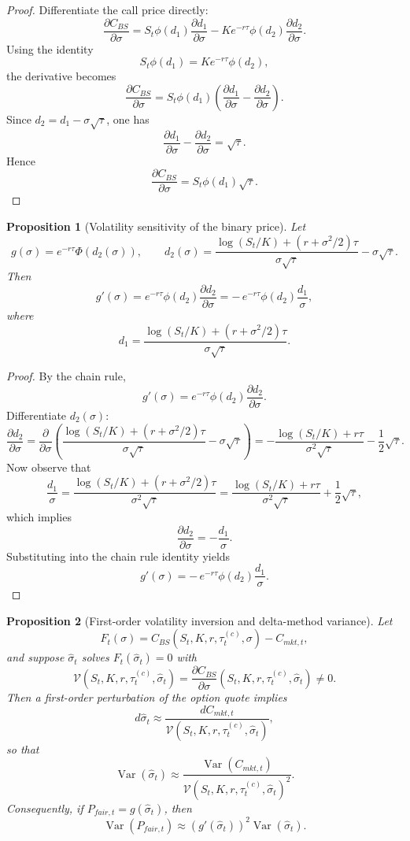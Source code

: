 \documentclass[11pt]{article}
\numberwithin{equation}{section}
\theoremstyle{plain}
\newtheorem{proposition}{Proposition}[section]
\begin{document}
\begin{proof}
Differentiate the call price directly:
\[
\frac{\partial C_{BS}}{\partial \sigma}
=
S_t\phi(d_1)\frac{\partial d_1}{\partial \sigma}
-Ke^{-r\tau}\phi(d_2)\frac{\partial d_2}{\partial \sigma}.
\]
Using the identity
\[
S_t\phi(d_1)=Ke^{-r\tau}\phi(d_2),
\]
the derivative becomes
\[
\frac{\partial C_{BS}}{\partial \sigma}
=
S_t\phi(d_1)\left(\frac{\partial d_1}{\partial \sigma}-\frac{\partial d_2}{\partial \sigma}\right).
\]
Since $d_2=d_1-\sigma\sqrt{\tau}$, one has
\[
\frac{\partial d_1}{\partial \sigma}-\frac{\partial d_2}{\partial \sigma}=\sqrt{\tau}.
\]
Hence
\[
\frac{\partial C_{BS}}{\partial \sigma}=S_t\phi(d_1)\sqrt{\tau}.
\]
\end{proof}

\begin{proposition}[Volatility sensitivity of the binary price]
\label{prop:digital-sensitivity}
Let
\[
g(\sigma)=e^{-r\tau}\Phi(d_2(\sigma)),
\qquad
d_2(\sigma)=\frac{\log(S_t/K)+(r+\sigma^2/2)\tau}{\sigma\sqrt{\tau}}-\sigma\sqrt{\tau}.
\]
Then
\[
g'(\sigma)
=
e^{-r\tau}\phi(d_2)\frac{\partial d_2}{\partial \sigma}
=
-\,e^{-r\tau}\phi(d_2)\frac{d_1}{\sigma},
\]
where
\[
d_1=\frac{\log(S_t/K)+(r+\sigma^2/2)\tau}{\sigma\sqrt{\tau}}.
\]
\end{proposition}

\begin{proof}
By the chain rule,
\[
g'(\sigma)=e^{-r\tau}\phi(d_2)\frac{\partial d_2}{\partial \sigma}.
\]
Differentiate $d_2(\sigma)$:
\[
\frac{\partial d_2}{\partial \sigma}
=
\frac{\partial}{\partial \sigma}
\left(
\frac{\log(S_t/K)+(r+\sigma^2/2)\tau}{\sigma\sqrt{\tau}}-\sigma\sqrt{\tau}
\right)
=
-\frac{\log(S_t/K)+r\tau}{\sigma^2\sqrt{\tau}}-\frac{1}{2}\sqrt{\tau}.
\]
Now observe that
\[
\frac{d_1}{\sigma}
=
\frac{\log(S_t/K)+(r+\sigma^2/2)\tau}{\sigma^2\sqrt{\tau}}
=
\frac{\log(S_t/K)+r\tau}{\sigma^2\sqrt{\tau}}+\frac{1}{2}\sqrt{\tau},
\]
which implies
\[
\frac{\partial d_2}{\partial \sigma}=-\frac{d_1}{\sigma}.
\]
Substituting into the chain rule identity yields
\[
g'(\sigma)=-\,e^{-r\tau}\phi(d_2)\frac{d_1}{\sigma}.
\]
\end{proof}

\begin{proposition}[First-order volatility inversion and delta-method variance]
\label{prop:iv-delta}
Let
\[
F_t(\sigma)=C_{BS}(S_t,K,r,\tau_t^{(c)},\sigma)-C_{mkt,t},
\]
and suppose $\hat{\sigma}_t$ solves $F_t(\hat{\sigma}_t)=0$ with
\[
\mathcal{V}(S_t,K,r,\tau_t^{(c)},\hat{\sigma}_t)
=
\frac{\partial C_{BS}}{\partial \sigma}(S_t,K,r,\tau_t^{(c)},\hat{\sigma}_t)\neq 0.
\]
Then a first-order perturbation of the option quote implies
\[
d\hat{\sigma}_t
\approx
\frac{dC_{mkt,t}}{\mathcal{V}(S_t,K,r,\tau_t^{(c)},\hat{\sigma}_t)},
\]
so that
\[
\operatorname{Var}(\hat{\sigma}_t)
\approx
\frac{\operatorname{Var}(C_{mkt,t})}
{\mathcal{V}(S_t,K,r,\tau_t^{(c)},\hat{\sigma}_t)^2}.
\]
Consequently, if $P_{fair,t}=g(\hat{\sigma}_t)$, then
\[
\operatorname{Var}(P_{fair,t})
\approx
\left(g'(\hat{\sigma}_t)\right)^2
\operatorname{Var}(\hat{\sigma}_t).
\]
\end{proposition}
\end{document}
